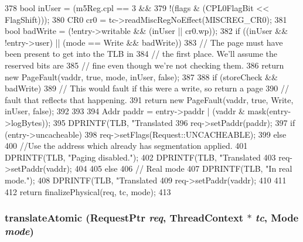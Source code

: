 \begin{DoxyCode}
{{{378             bool inUser = (m5Reg.cpl == 3 &&
379                     !(flags & (CPL0FlagBit << FlagShift)));
380             CR0 cr0 = tc->readMiscRegNoEffect(MISCREG_CR0);
381             bool badWrite = (!entry->writable && (inUser || cr0.wp));
382             if ((inUser && !entry->user) || (mode == Write && badWrite)) {
383                 // The page must have been present to get into the TLB in
384                 // the first place. We'll assume the reserved bits are
385                 // fine even though we're not checking them.
386                 return new PageFault(vaddr, true, mode, inUser, false);
387             }
388             if (storeCheck && badWrite) {
389                 // This would fault if this were a write, so return a page
390                 // fault that reflects that happening.
391                 return new PageFault(vaddr, true, Write, inUser, false);
392             }
393 
394             Addr paddr = entry->paddr | (vaddr & mask(entry->logBytes));
395             DPRINTF(TLB, "Translated %
396             req->setPaddr(paddr);
397             if (entry->uncacheable)
398                 req->setFlags(Request::UNCACHEABLE);
399         } else {
400             //Use the address which already has segmentation applied.
401             DPRINTF(TLB, "Paging disabled.\n");
402             DPRINTF(TLB, "Translated %
403             req->setPaddr(vaddr);
404         }
405     } else {
406         // Real mode
407         DPRINTF(TLB, "In real mode.\n");
408         DPRINTF(TLB, "Translated %
409         req->setPaddr(vaddr);
410     }
411 
412     return finalizePhysical(req, tc, mode);
413 }
\end{DoxyCode}
\hypertarget{classX86ISA_1_1TLB_ad54e01e3c0a1613098a76b7f92e5be93}{
\subsubsection[{translateAtomic}]{ translateAtomic ({\bf RequestPtr} {\em req}, \/  {\bf ThreadContext} $\ast$ {\em tc}, \/  {\bf Mode} {\em mode})}}
\label{classX86ISA_1_1TLB_ad54e01e3c0a1613098a76b7f92e5be93}



